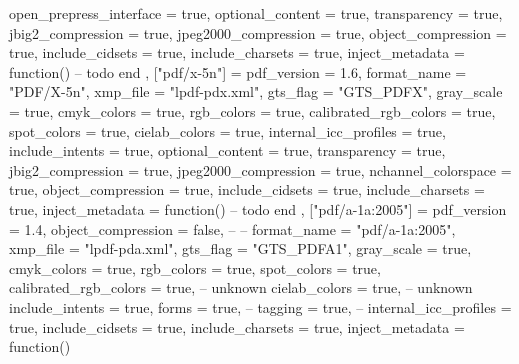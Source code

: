 {{            open_prepress_interface = true,
            optional_content        = true,
            transparency            = true,
            jbig2_compression       = true,
            jpeg2000_compression    = true,
            object_compression      = true,
            include_cidsets         = true,
            include_charsets        = true,
            inject_metadata         = function()
                -- todo
            end
        },
        ["pdf/x-5n"] = {
            pdf_version             = 1.6,
            format_name             = "PDF/X-5n",
            xmp_file                = "lpdf-pdx.xml",
            gts_flag                = "GTS_PDFX",
            gray_scale              = true,
            cmyk_colors             = true,
            rgb_colors              = true,
            calibrated_rgb_colors   = true,
            spot_colors             = true,
            cielab_colors           = true,
            internal_icc_profiles   = true,
            include_intents         = true,
            optional_content        = true,
            transparency            = true,
            jbig2_compression       = true,
            jpeg2000_compression    = true,
            nchannel_colorspace     = true,
            object_compression      = true,
            include_cidsets         = true,
            include_charsets        = true,
            inject_metadata         = function()
                -- todo
            end
        },
        ["pdf/a-1a:2005"] = {
            pdf_version             = 1.4,
            object_compression      = false, -- %
                                             -- %
            format_name             = "pdf/a-1a:2005",
            xmp_file                = "lpdf-pda.xml",
            gts_flag                = "GTS_PDFA1",
            gray_scale              = true,
            cmyk_colors             = true,
            rgb_colors              = true,
            spot_colors             = true,
            calibrated_rgb_colors   = true, -- unknown
            cielab_colors           = true, -- unknown
            include_intents         = true,
            forms                   = true, -- %
            tagging                 = true, -- %
            internal_icc_profiles   = true,
            include_cidsets         = true,
            include_charsets        = true,
            inject_metadata         = function()
}}
